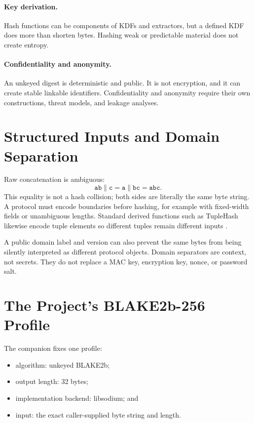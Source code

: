 \paragraph{Key derivation.}
Hash functions can be components of KDFs and extractors, but a defined KDF does
more than shorten bytes. Hashing weak or predictable material does not create
entropy.

\paragraph{Confidentiality and anonymity.}
An unkeyed digest is deterministic and public. It is not encryption, and it
can create stable linkable identifiers. Confidentiality and anonymity require
their own constructions, threat models, and leakage analyses.

\section{Structured Inputs and Domain Separation}

Raw concatenation is ambiguous:
\[
    \mathtt{ab} \mathbin\| \mathtt{c}
    =
    \mathtt{a} \mathbin\| \mathtt{bc}
    =
    \mathtt{abc}.
\]
This equality is not a hash collision; both sides are literally the same byte
string. A protocol must encode boundaries before hashing, for example with
fixed-width fields or unambiguous lengths. Standard derived functions such as
TupleHash likewise encode tuple elements so different tuples remain different
inputs \cite{nist800185}.

A public domain label and version can also prevent the same bytes from being
silently interpreted as different protocol objects. Domain separators are
context, not secrets. They do not replace a MAC key, encryption key, nonce, or
password salt.

\section{The Project's BLAKE2b-256 Profile}

The companion fixes one profile:

\begin{itemize}
    \item algorithm: unkeyed BLAKE2b;
    \item output length: 32 bytes;
    \item implementation backend: libsodium; and
    \item input: the exact caller-supplied byte string and length.
\end{itemize}

